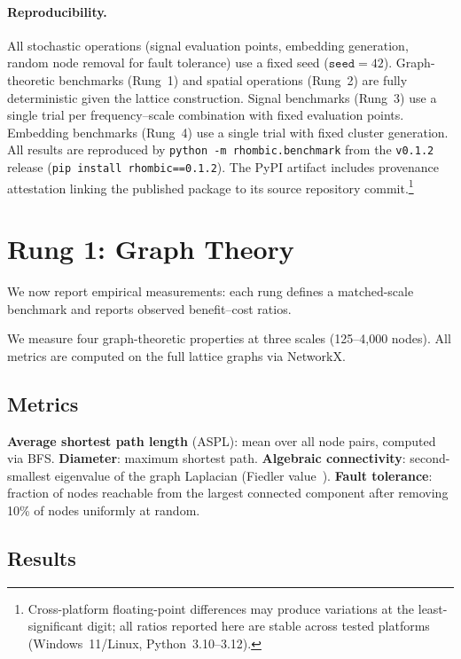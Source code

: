\documentclass[11pt]{article}
\begin{document}
\paragraph{Reproducibility.}
All stochastic operations (signal evaluation points, embedding
generation, random node removal for fault tolerance) use a fixed
seed ($\mathtt{seed}=42$). Graph-theoretic benchmarks (Rung~1)
and spatial operations (Rung~2) are fully deterministic given the
lattice construction. Signal benchmarks (Rung~3) use a single
trial per frequency--scale combination with fixed evaluation
points. Embedding benchmarks (Rung~4) use a single trial with
fixed cluster generation. All results are reproduced by
\texttt{python~-m~rhombic.benchmark} from the \texttt{v0.1.2}
release (\texttt{pip install rhombic==0.1.2}). The PyPI artifact
includes provenance attestation linking the published package to
its source repository commit.\footnote{Cross-platform floating-point differences
may produce variations at the least-significant digit; all ratios
reported here are stable across tested platforms (Windows~11/Linux,
Python~3.10--3.12).}

\section{Rung 1: Graph Theory}
\label{sec:graph}

We now report empirical measurements: each rung defines a
matched-scale benchmark and reports observed benefit--cost ratios.

We measure four graph-theoretic properties at three scales
(125--4{,}000 nodes). All metrics are computed on the full
lattice graphs via NetworkX.

\subsection{Metrics}

\textbf{Average shortest path length} (ASPL): mean over all
node pairs, computed via BFS. \textbf{Diameter}: maximum
shortest path. \textbf{Algebraic connectivity}: second-smallest
eigenvalue of the graph Laplacian (Fiedler
value~\cite{fiedler1973}). \textbf{Fault tolerance}: fraction
of nodes reachable from the largest connected component after
removing 10\% of nodes uniformly at random.

\subsection{Results}
\end{document}
